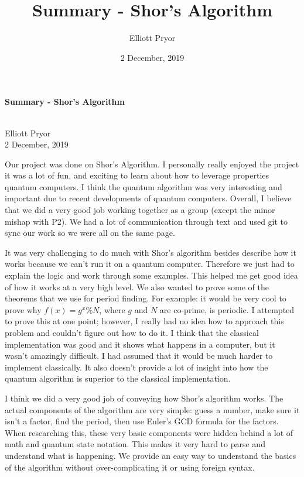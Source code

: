 \documentclass[a4paper]{article}
\title{Summary - Shor's Algorithm}
\author{Elliott Pryor}
\date{2 December, 2019}
\begin{document}
\begin{center}

\begin{Large}
\textbf{Summary - Shor's Algorithm}
\end{Large}\\
\vspace{1em}
Elliott Pryor\\

2 December, 2019
\end{center}


Our project was done on Shor's Algorithm. I personally really enjoyed the project it was a lot of fun,
and exciting to learn about how to leverage properties quantum computers. I think the quantum algorithm was very interesting and important due to recent developments of quantum computers.
Overall, I believe that we did a very good job working together as a group (except the minor mishap with P2).
We had a lot of communication through text and used git to sync our work so we were all on the same page.

It was very challenging to do much with Shor's algorithm besides describe how it works because we can't run it on a quantum computer.
Therefore we just had to explain the logic and work through some examples. This helped me get good idea of how it works at a very high level.
We also wanted to prove some of the theorems that we use for period finding. For example: it would be very cool to prove why $f(x) = g^x \% N$,
where $g$ and $N$ are co-prime, is periodic. I attempted to prove this at one point;
however, I really had no idea how to approach this problem and couldn't figure out how to do it.
I think that the classical implementation was good and it shows what happens in a computer,
but it wasn't amazingly difficult. I had assumed that it would be much harder to implement classically.
It also doesn't provide a lot of insight into how the quantum algorithm is superior to the classical implementation.

I think we did a very good job of conveying how Shor's algorithm works. The actual components of the algorithm are very simple: guess a number,
make sure it isn't a factor, find the period, then use Euler's GCD formula for the factors.
When researching this, these very basic components were hidden behind a lot of math and quantum state notation.
This makes it very hard to parse and understand what is happening. We provide an easy way to  understand the basics of the algorithm without over-complicating it or using foreign syntax.
\end{document}
